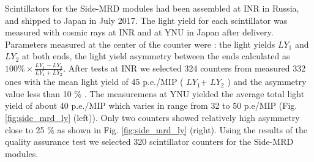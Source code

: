 

Scintillators for the Side-MRD modules had been assembled at INR in Russia, and shipped to Japan in July 2017. The light yield for each scintillator was measured with cosmic rays at INR and at YNU in Japan after delivery.  Parameters measured at the center of the counter were : the light yields  $LY_{1}$ and $LY_{2}$ at both ends, the light yield asymmetry between the ends calculated as $100\% \times \frac{LY_{1}-LY_{2}}{LY_{1}+LY_{2}}$.
After tests at INR we selected 324 counters from measured 332 ones with the mean light yield of 45 p.e./MIP ( $LY_{1}$+ $LY_{2}$ ) and the asymmetry value less than 10 \% . 
The measuremens at YNU yielded the average total light yield of about 40 p.e./MIP which varies in range  from 32 to 50 p.e/MIP  (Fig. \ref{fig:side_mrd_ly} (left)). Only two counters  showed relatively high asymmetry close to 25 \% as shown in Fig. \ref{fig:side_mrd_ly} (right). 
Using the results of the quality assurance test  we selected 320 scintillator counters for the Side-MRD modules. 

